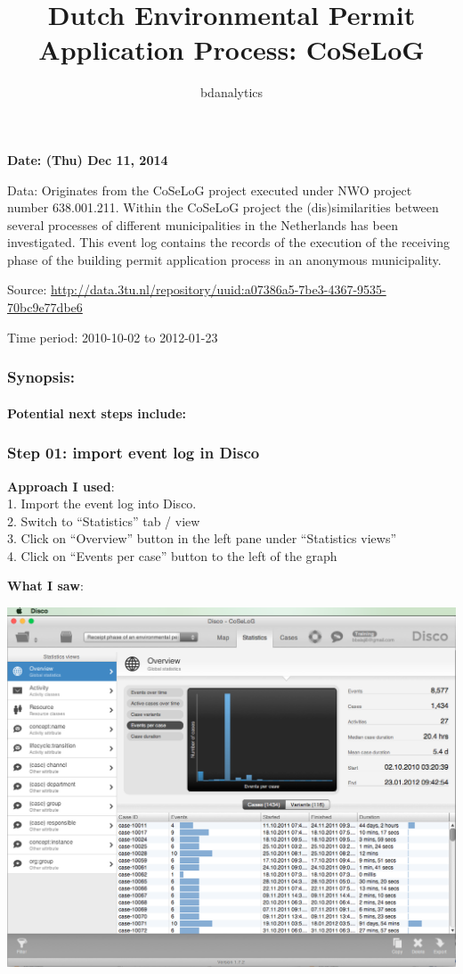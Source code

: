 \documentclass[]{article}
\title{Dutch Environmental Permit Application Process: CoSeLoG}
\author{bdanalytics}
\date{}
\begin{document}
\maketitle


{
\hypersetup{linkcolor=black}
\setcounter{tocdepth}{2}
\tableofcontents
}
\textbf{Date: (Thu) Dec 11, 2014}

Data: Originates from the CoSeLoG project executed under NWO project
number 638.001.211. Within the CoSeLoG project the (dis)similarities
between several processes of different municipalities in the Netherlands
has been investigated. This event log contains the records of the
execution of the receiving phase of the building permit application
process in an anonymous municipality.

Source:
\url{http://data.3tu.nl/repository/uuid:a07386a5-7be3-4367-9535-70bc9e77dbe6}

Time period: 2010-10-02 to 2012-01-23

\subsubsection{Synopsis:}\label{synopsis}

\paragraph{Potential next steps
include:}\label{potential-next-steps-include}

\subsubsection{Step 01: import event log in
Disco}\label{step-01-import-event-log-in-disco}

\textbf{Approach I used}:\\1. Import the event log into Disco.\\2.
Switch to ``Statistics'' tab / view\\3. Click on ``Overview'' button in
the left pane under ``Statistics views''\\4. Click on ``Events per
case'' button to the left of the graph

\textbf{What I saw}:

\includegraphics{CoSeLoG_Step_01_Q_01.png}
\end{document}
